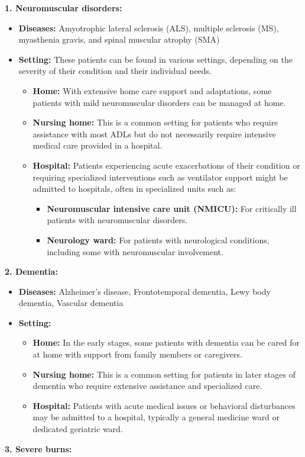 \textbf{1. Neuromuscular disorders:}

\begin{itemize}
    \item \textbf{Diseases:} Amyotrophic lateral sclerosis (ALS), multiple sclerosis (MS), myasthenia gravis, and spinal muscular atrophy (SMA)
    \item \textbf{Setting:} These patients can be found in various settings, depending on the severity of their condition and their individual needs. 

\begin{itemize}
        \item \textbf{Home:} With extensive home care support and adaptations, some patients with mild neuromuscular disorders can be managed at home.
        \item \textbf{Nursing home:} This is a common setting for patients who require assistance with most ADLs but do not necessarily require intensive medical care provided in a hospital.
        \item \textbf{Hospital:} Patients experiencing acute exacerbations of their condition or requiring specialized interventions such as ventilator support might be admitted to hospitals, often in specialized units such as: 

    \begin{itemize}
            \item \textbf{Neuromuscular intensive care unit (NMICU):} For critically ill patients with neuromuscular disorders.
            \item \textbf{Neurology ward:} For patients with neurological conditions, including some with neuromuscular involvement. 
    \end{itemize}

\end{itemize}

\end{itemize}
\textbf{2. Dementia:}

\begin{itemize}
    \item \textbf{Diseases:} Alzheimer's disease, Frontotemporal dementia, Lewy body dementia, Vascular dementia
    \item \textbf{Setting:} 

\begin{itemize}
        \item \textbf{Home:} In the early stages, some patients with dementia can be cared for at home with support from family members or caregivers.
        \item \textbf{Nursing home:} This is a common setting for patients in later stages of dementia who require extensive assistance and specialized care.
        \item \textbf{Hospital:} Patients with acute medical issues or behavioral disturbances may be admitted to a hospital, typically a general medicine ward or dedicated geriatric ward. 
\end{itemize}

\end{itemize}
\textbf{3. Severe burns:}

